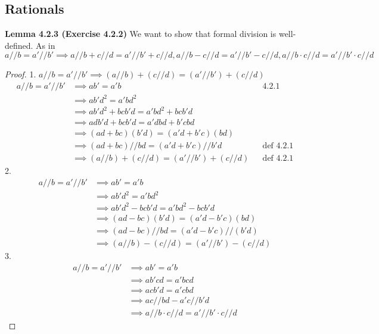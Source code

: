\documentclass[answers,12pt]{exam}
\begin{document}
\subsection{Rationals}

\textbf{Lemma 4.2.3 (Exercise 4.2.2)} 
We want to show that formal division is well-defined.
As in $a//b = a'//b' \implies a//b + c//d = a'//b' + c//d, a//b-c//d = a'//b'-c//d, a//b \cdot c//d = a'//b' \cdot c//d$

\begin{solution}
\begin{proof}
    1. $a//b=a'//b' \implies (a//b)+(c//d) = (a'//b')+(c//d)$
    \begin{align*}
        a//b = a'//b' &\implies ab' = a'b && \text{4.2.1} \\
        &\implies ab'd^2 = a'bd^2 \\
        &\implies ab'd^2 + bcb'd = a'bd^2 + bcb'd \\
        &\implies adb'd + bcb'd = a'dbd + b'cbd \\
        &\implies (ad+bc)(b'd) = (a'd + b'c)(bd) \\
        &\implies (ad + bc) // bd = (a'd + b'c)//b'd && \text{def 4.2.1}\\
        &\implies (a//b) + (c//d) = (a'//b')+(c//d) && \text{def 4.2.1}
    \end{align*}
    2. 
    \begin{align*}
        a//b = a'//b' &\implies ab' = a'b \\
        &\implies ab'd^2=a'bd^2 \\
        &\implies ab'd^2-bcb'd=a'bd^2-bcb'd \\
        &\implies (ad-bc)(b'd) = (a'd-b'c)(bd) \\
        &\implies (ad-bc)//bd = (a'd-b'c)//(b'd)\\
        &\implies (a//b)-(c//d)=(a'//b')-(c//d)
    \end{align*}
    3.
    \begin{align*}
        a//b=a'//b' &\implies ab'=a'b \\
        &\implies ab'cd=a'bcd \\
        &\implies acb'd=a'cbd \\
        &\implies ac//bd-a'c//b'd \\
        &\implies a//b \cdot c//d = a'//b' \cdot c//d
    \end{align*}
\end{proof}
\end{solution}
\end{document}
